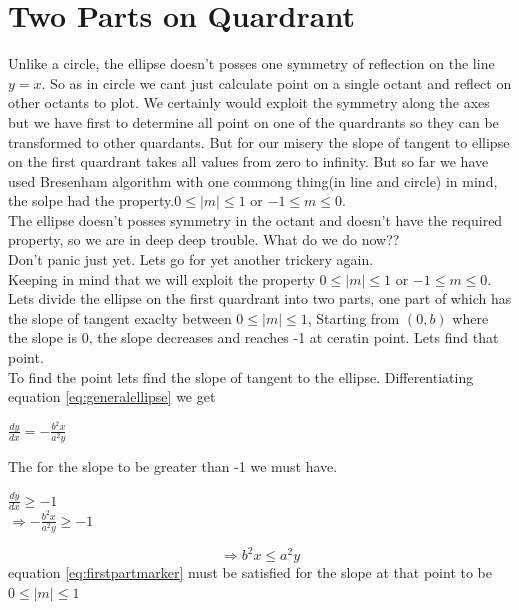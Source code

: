 \documentclass[a4paper,12pt,oneside]{book}
\begin{document}
 \section{Two Parts on Quardrant}
 

 Unlike a circle, the ellipse doesn't posses one symmetry of reflection on the line $y=x$. So as in circle we cant just calculate point on a single octant and reflect on other octants to plot. We certainly would exploit the symmetry along the axes but we have first to determine all point on one of the quardrants so they can be transformed to other quardants. But for our misery the slope of tangent to ellipse on the first quardrant takes all values from zero to infinity. But so far we have used Bresenham algorithm with one commong thing(in line and circle) in mind, the solpe had the property.$0 \leq \vert m \vert \leq 1$ or $-1\leq m \leq 0$. \\
 The ellipse doesn't posses symmetry in the octant and doesn't have the required property, so we are in deep deep trouble. What do we do now??\\
 Don't panic just yet. Lets go for yet another  trickery again.\\

Keeping in mind that we will exploit the property $0 \leq \vert m \vert \leq 1$ or $-1\leq m \leq 0$.  Lets divide the ellipse on the first quardrant into two parts, one part of which has the slope of tangent exaclty between $0 \leq \vert m \vert \leq 1$, Starting from $(0,b)$ where the slope is 0, the slope decreases and reaches -1 at ceratin point. Lets find that point.\\
To find the point lets find the slope of tangent to the ellipse. Differentiating equation \ref{eq:generalellipse} we get

\begin{center}
	$\frac{dy}{dx}=-\frac{b^2x}{a^2y} $
\end{center}
The for the slope to be greater than -1 we must have.
\begin{center}
	$\frac{dy}{dx}\geq -1$\\
	$\Rightarrow -\frac{b^2x}{a^2y} \geq -1$
\end{center}
\begin{equation} \label{eq:firstpartmarker}
	\Rightarrow b^2x\leq a^2y
\end{equation}
equation \ref{eq:firstpartmarker} must be satisfied for the slope at that point to be $0 \leq \vert m \vert \leq 1$
\end{document}
